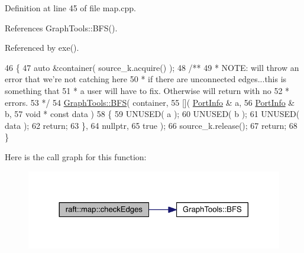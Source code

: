 Definition at line 45 of file map.\+cpp.



References Graph\+Tools\+::\+B\+F\+S().



Referenced by exe().


\begin{DoxyCode}
46 \{
47    \textcolor{keyword}{auto} &container( source\_k.acquire() );\textcolor{comment}{}
48 \textcolor{comment}{   /**}
49 \textcolor{comment}{    * NOTE: will throw an error that we're not catching here}
50 \textcolor{comment}{    * if there are unconnected edges...this is something that}
51 \textcolor{comment}{    * a user will have to fix.  Otherwise will return with no}
52 \textcolor{comment}{    * errors.}
53 \textcolor{comment}{    */}
54    \hyperlink{class_graph_tools_ade51007699cbd681c1a37946609c46ee}{GraphTools::BFS}( container,
55                     []( \hyperlink{struct_port_info}{PortInfo} &  a, 
56                         \hyperlink{struct_port_info}{PortInfo} &  b, 
57                         \textcolor{keywordtype}{void} *  \textcolor{keyword}{const} data )
58                     \{
59                        UNUSED( a );
60                        UNUSED( b );
61                        UNUSED( data );
62                        \textcolor{keywordflow}{return};
63                     \},
64                     \textcolor{keyword}{nullptr},
65                     true );
66    source\_k.release();
67    \textcolor{keywordflow}{return};
68 \}
\end{DoxyCode}
Here is the call graph for this function\+:
\nopagebreak
\begin{figure}[H]
\begin{center}
\leavevmode
\includegraphics[width=324pt]{classraft_1_1map_aad8ce35fdb536b14db16b3462157dcd7_cgraph}
\end{center}
\end{figure}
\hypertarget{classraft_1_1map_a9eb65e50373f006fb193c203f8cab7d8}{}\label{classraft_1_1map_a9eb65e50373f006fb193c203f8cab7d8} 
